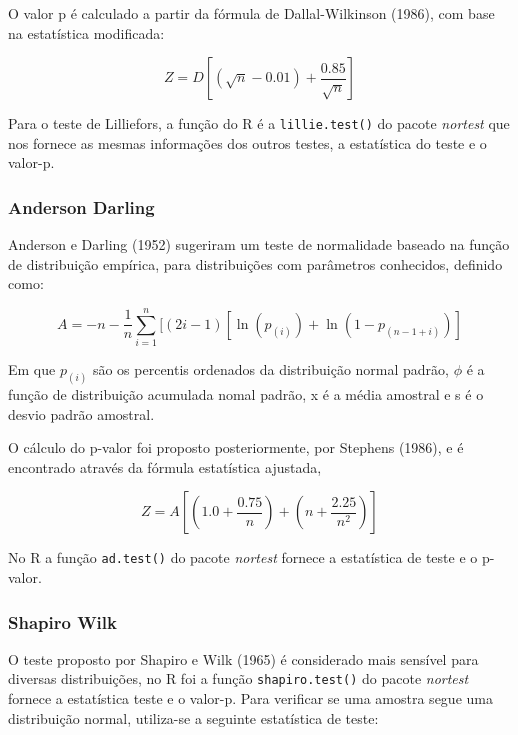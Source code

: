 \documentclass[a4paper,11pt]{article} %
\begin{document}
O valor p é calculado a partir da fórmula de Dallal-Wilkinson (1986), com base na estatística modificada:

\begin{equation}
    Z = D \left[(\sqrt{n} - 0.01) + \frac{0.85}{\sqrt{n}} \right]
\end{equation}


\vskip0.3cm


Para o teste de Lilliefors, a função do R é a \texttt{lillie.test()} do pacote \textit{nortest} que nos fornece as mesmas informações dos outros testes, a estatística do teste e o valor-p.\vskip0.3cm






\subsubsection{Anderson Darling}

Anderson e Darling (1952) sugeriram um teste de normalidade baseado na função de distribuição empírica, para distribuições com parâmetros conhecidos, definido como: 

\begin{equation}
    A = -n - \frac{1}{n} \sum_{i=1}^{n} [(2i-1)[ \ln (p_{(i)}) + \ln(1- p_{(n-1+i)})]
\end{equation}

Em que $p_{(i)}$ são os percentis ordenados da distribuição normal padrão, $\phi$ é a função de distribuição acumulada nomal padrão, x é a média amostral e s é o desvio padrão amostral.\vskip0.3cm

O cálculo do p-valor foi proposto posteriormente, por Stephens (1986), e é encontrado através da fórmula estatística ajustada,

\begin{equation}
    Z = A \left[ \left(1.0 + \frac{0.75}{n} \right)+  \left(n+\frac{2.25}{n^{2}} \right) \right]
\end{equation}


No R a função \texttt{ad.test()} do pacote \textit{nortest} fornece a estatística de teste e o p-valor. \vskip0.3cm

\subsubsection{Shapiro Wilk}

O teste proposto por Shapiro e Wilk (1965) é considerado mais sensível para diversas distribuições, no R foi a função \texttt{shapiro.test()} do pacote \textit{nortest} fornece a estatística teste e o valor-p. Para verificar se uma amostra segue uma distribuição normal, utiliza-se a seguinte estatística de teste: 
\end{document}
